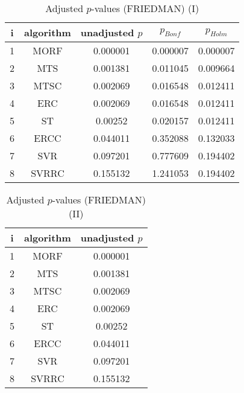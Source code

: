 \documentclass[a4paper,10pt]{article}
\begin{document}
\begin{landscape}
\begin{table}[!htp]
\centering\small
\begin{tabular}{ccccc}
i&algorithm&unadjusted $p$&$p_{Bonf}$&$p_{Holm}$\\
\hline1&MORF&0.000001&0.000007&0.000007\\2&MTS&0.001381&0.011045&0.009664\\3&MTSC&0.002069&0.016548&0.012411\\4&ERC&0.002069&0.016548&0.012411\\5&ST&0.00252&0.020157&0.012411\\6&ERCC&0.044011&0.352088&0.132033\\7&SVR&0.097201&0.777609&0.194402\\8&SVRRC&0.155132&1.241053&0.194402\\\hline
\end{tabular}
\caption{Adjusted $p$-values (FRIEDMAN) (I)}
\end{table}
\begin{table}[!htp]
\centering\small
\begin{tabular}{ccc}
i&algorithm&unadjusted $p$\\
\hline1&MORF&0.000001\\2&MTS&0.001381\\3&MTSC&0.002069\\4&ERC&0.002069\\5&ST&0.00252\\6&ERCC&0.044011\\7&SVR&0.097201\\8&SVRRC&0.155132\\\hline
\end{tabular}
\caption{Adjusted $p$-values (FRIEDMAN) (II)}
\end{table}

\newpage
\end{landscape}
\end{document}
